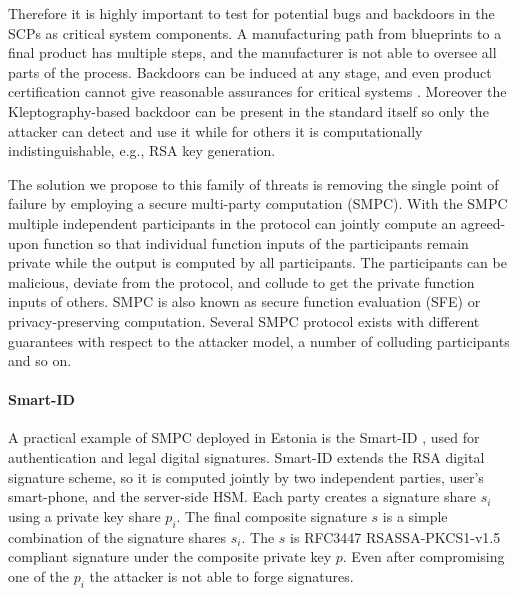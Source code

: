\documentclass[
  digital, %
  twoside, %
  table,   %
  lof,     %
  lot,     %
]{fithesis3}
\theoremstyle{definition}
\theoremstyle{remark}
\begin{document}
\begin{ecmmnt}
    Therefore it is highly important to test for potential
    bugs and backdoors in the SCPs as critical system components. A manufacturing path from blueprints to a final product has multiple steps, and the manufacturer is not able to oversee all parts of the process. Backdoors can be induced at any stage, and even product certification cannot give reasonable assurances for critical systems \cite{2017-ccs-nemec}. Moreover the Kleptography-based \cite{Young:1997:KUC:1754542.1754551} backdoor can be present in the standard itself so only the attacker can detect and use it while for others it is computationally indistinguishable, e.g., RSA key generation. 
    
    The solution we propose to this family of threats is removing the single point of failure by employing a secure multi-party computation (SMPC). 
    With the SMPC multiple independent participants in the protocol can jointly compute an agreed-upon function so that individual function inputs of the participants remain private while the output is computed by all participants. The participants can be malicious, deviate from the protocol, and collude to get the private function inputs of others. SMPC is also known as secure function evaluation (SFE) or privacy-preserving computation. Several SMPC protocol exists with different guarantees with respect to the attacker model, a number of colluding participants and so on.
    
    \paragraph{Smart-ID} A practical example of SMPC deployed in Estonia is the Smart-ID \cite{smart_id_ee}, used for authentication and legal digital signatures. Smart-ID extends the RSA digital signature scheme, so it is computed jointly by two independent parties, user's smart-phone, and the server-side HSM. 
    Each party creates a signature share $s_i$ using a private key share $p_i$. The final composite signature $s$ is a simple combination of the signature shares $s_i$. 
    The $s$ is RFC3447 \cite{rfc3447} RSASSA-PKCS1-v1.5 compliant signature under the composite private key $p$. Even after compromising one of the $p_i$ the attacker is not able to forge signatures.



\end{ecmmnt}
\end{document}

